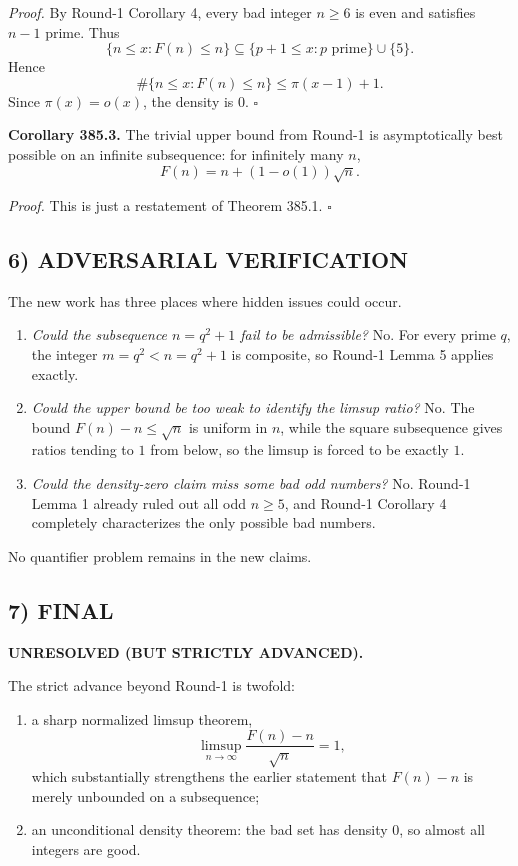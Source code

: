 \emph{Proof.} By Round-1 Corollary 4, every bad integer $n\geq 6$ is even and satisfies $n-1$ prime. Thus
\[
\{n\leq x: F(n)\leq n\}\subseteq \{p+1\leq x: p\text{ prime}\}\cup\{5\}.
\]
Hence
\[
\#\{n\leq x: F(n)\leq n\}\leq \pi(x-1)+1.
\]
Since $\pi(x)=o(x)$, the density is $0$. \hfill $\square$

\medskip

\textbf{Corollary 385.3.} The trivial upper bound from Round-1 is asymptotically best possible on an infinite subsequence: for infinitely many $n$,
\[
F(n)=n+(1-o(1))\sqrt n.
\]

\emph{Proof.} This is just a restatement of Theorem 385.1. \hfill $\square$

\subsection*{6) ADVERSARIAL VERIFICATION}
The new work has three places where hidden issues could occur.

\begin{enumerate}
\item \emph{Could the subsequence $n=q^2+1$ fail to be admissible?} No. For every prime $q$, the integer $m=q^2<n=q^2+1$ is composite, so Round-1 Lemma 5 applies exactly.
\item \emph{Could the upper bound be too weak to identify the limsup ratio?} No. The bound $F(n)-n\leq \sqrt n$ is uniform in $n$, while the square subsequence gives ratios tending to $1$ from below, so the limsup is forced to be exactly $1$.
\item \emph{Could the density-zero claim miss some bad odd numbers?} No. Round-1 Lemma 1 already ruled out all odd $n\geq 5$, and Round-1 Corollary 4 completely characterizes the only possible bad numbers.
\end{enumerate}

No quantifier problem remains in the new claims.

\subsection*{7) FINAL}
\textbf{UNRESOLVED (BUT STRICTLY ADVANCED).}

The strict advance beyond Round-1 is twofold:

\begin{enumerate}
\item a sharp normalized limsup theorem,
\[
\limsup_{n\to\infty}\frac{F(n)-n}{\sqrt n}=1,
\]
which substantially strengthens the earlier statement that $F(n)-n$ is merely unbounded on a subsequence;
\item an unconditional density theorem: the bad set has density $0$, so almost all integers are good.
\end{enumerate}

